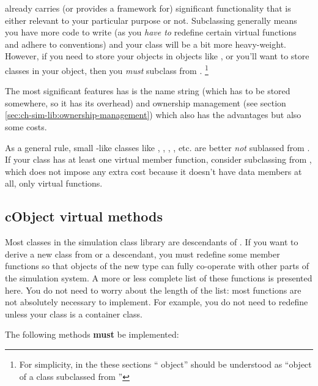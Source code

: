  already carries (or provides a framework for)
significant functionality that is either relevant to
your particular purpose or not. Subclassing 
generally means you have more code to write (as you \textit{have to}
redefine certain virtual functions and adhere to conventions)
and your class will be a bit more heavy-weight.
However, if you need to store your objects in {\opp} objects like ,
or you'll want to store {\opp} classes in your object,
then you \textit{must} subclass from .
  \footnote{For simplicity, in the these sections ``{\opp} object''
  should be understood as ``object of a class subclassed from
  ''}

The most significant features  has is
the name string (which has to be stored somewhere, so it has
its overhead) and ownership management (see section
\ref{sec:ch-sim-lib:ownership-management}) which
also has the advantages but also some costs.

As a general rule, small -like classes like ,
, , , etc.
are better \textit{not} sublassed from .
If your class has at least one virtual member function, consider
subclassing from , which does not impose any
extra cost because it doesn't have data members at all, only
virtual functions.


\subsection{cObject virtual methods}

Most classes in the simulation class library are descendants of
. If you want to derive a new class from
 or a  descendant, you must redefine
some member functions so that objects of the new type can fully
co-operate with other parts of the simulation system. A more or less
complete list of these functions is presented here. You do not need to
worry about the length of the list: most functions are not
absolutely necessary to implement. For example, you do not need to
redefine  unless your class is a container class.

The following methods \textbf{must} be implemented:

